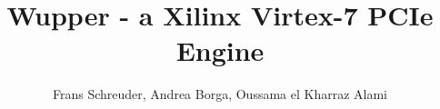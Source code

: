 \author{Frans Schreuder, Andrea Borga, Oussama el Kharraz Alami}
\title{\large Wupper - \small a Xilinx Virtex-7 PCIe Engine}

\date{\SetDocumentDate}
\def\DocVer{Rev 2.3}
\def\SetDocumentDate{04-10-2016}













\begin{appendices}
	
	
	
\end{appendices}

